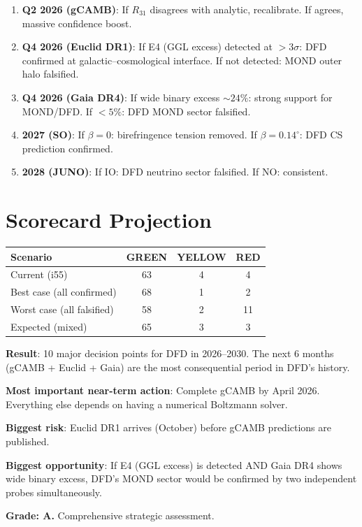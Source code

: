 \documentclass[11pt,a4paper]{article}
\newcommand{\GREEN}{\textcolor{dfdgreen}{\textbf{GREEN}}}
\newcommand{\YELLOW}{\textcolor{dfdyellow}{\textbf{YELLOW}}}
\newcommand{\RED}{\textcolor{dfdred}{\textbf{RED}}}
\begin{document}
\begin{enumerate}
\item \textbf{Q2 2026 (gCAMB)}: If $R_{31}$ disagrees with analytic, recalibrate. If agrees, massive confidence boost.
\item \textbf{Q4 2026 (Euclid DR1)}: If E4 (GGL excess) detected at $> 3\sigma$: DFD confirmed at galactic--cosmological interface. If not detected: MOND outer halo falsified.
\item \textbf{Q4 2026 (Gaia DR4)}: If wide binary excess $\sim 24\%$: strong support for MOND/DFD. If $< 5\%$: DFD MOND sector falsified.
\item \textbf{2027 (SO)}: If $\beta = 0$: birefringence tension removed. If $\beta = 0.14^\circ$: DFD CS prediction confirmed.
\item \textbf{2028 (JUNO)}: If IO: DFD neutrino sector falsified. If NO: consistent.
\end{enumerate}

\section{Scorecard Projection}

\begin{center}
\begin{tabular}{lccc}
\toprule
\textbf{Scenario} & \GREEN & \YELLOW & \RED \\
\midrule
Current (i55) & 63 & 4 & 4 \\
Best case (all confirmed) & 68 & 1 & 2 \\
Worst case (all falsified) & 58 & 2 & 11 \\
Expected (mixed) & 65 & 3 & 3 \\
\bottomrule
\end{tabular}
\end{center}

\begin{tcolorbox}[colback=blue!5!white, colframe=blue!60!black, title={Agent 20: Testability Roadmap}]
\textbf{Result}: 10 major decision points for DFD in 2026--2030. The next 6 months (gCAMB + Euclid + Gaia) are the most consequential period in DFD's history.

\textbf{Most important near-term action}: Complete gCAMB by April 2026. Everything else depends on having a numerical Boltzmann solver.

\textbf{Biggest risk}: Euclid DR1 arrives (October) before gCAMB predictions are published.

\textbf{Biggest opportunity}: If E4 (GGL excess) is detected AND Gaia DR4 shows wide binary excess, DFD's MOND sector would be confirmed by two independent probes simultaneously.

\textbf{Grade: A.} Comprehensive strategic assessment.
\end{tcolorbox}
\end{document}

